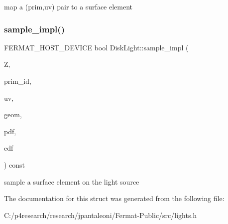 map a (prim,uv) pair to a surface element \mbox{\label{struct_disk_light_a79772898d99e5779c17ef39d9b9ac3bd}} 
\subsubsection{\texorpdfstring{sample\+\_\+impl()}{sample\_impl()}}
{\footnotesize\ttfamily F\+E\+R\+M\+A\+T\+\_\+\+H\+O\+S\+T\+\_\+\+D\+E\+V\+I\+CE bool Disk\+Light\+::sample\+\_\+impl (\begin{DoxyParamCaption}\item[{const float $\ast$}]{Z,  }\item[{uint32\+\_\+t $\ast$}]{prim\+\_\+id,  }\item[{\hyperlink{structcugar_1_1_vector}{cugar\+::\+Vector2f} $\ast$}]{uv,  }\item[{\hyperlink{struct_vertex_geometry}{Vertex\+Geometry} $\ast$}]{geom,  }\item[{float $\ast$}]{pdf,  }\item[{\hyperlink{struct_edf}{Edf} $\ast$}]{edf }\end{DoxyParamCaption}) const\hspace{0.3cm}{\ttfamily [inline]}}

sample a surface element on the light source 

The documentation for this struct was generated from the following file\+:\begin{DoxyCompactItemize}
\item 
C\+:/p4research/research/jpantaleoni/\+Fermat-\/\+Public/src/lights.\+h\end{DoxyCompactItemize}
